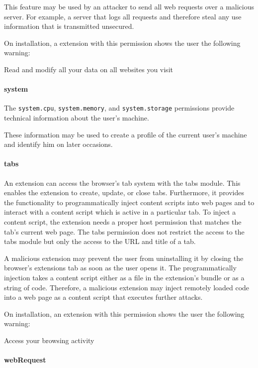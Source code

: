 	This feature may be used by an attacker to send all web requests over a malicious server. For example, a server that logs all requests and therefore steal any use information that is transmitted unsecured.
	
	On installation, a extension with this permission shows the user the following warning:
	\begin{permissionwarning}
		Read and modify all your data on all websites you visit 
	\end{permissionwarning}
	
\paragraph{system}
	The \texttt{system.cpu}, \texttt{system.memory}, and \texttt{system.storage} permissions provide technical information about the user's machine.
	
	These information may be used to create a profile of the current user's machine and identify him on later occasions.
	
\paragraph{tabs}
	An extension can access the browser's tab system with the tabs module. This enables the extension to create, update, or close tabs. Furthermore, it provides the functionality to programmatically inject content scripts into web pages and to interact with a content script which is active in a particular tab. To inject a content script, the extension needs a proper host permission that matches the tab's current web page. The tabs permission does not restrict the access to the tabs module but only the access to the URL and title of a tab. 
	
	A malicious extension may prevent the user from uninstalling it by closing the browser's extensions tab as soon as the user opens it. The programmatically injection takes a content script either as a file in the extension's bundle or as a string of code. Therefore, a malicious extension may inject remotely loaded code into a web page as a content script that executes further attacks.
	
	On installation, an extension with this permission shows the user the following warning:
	\begin{permissionwarning}
		Access your browsing activity 
	\end{permissionwarning}		
	
\paragraph{webRequest}

